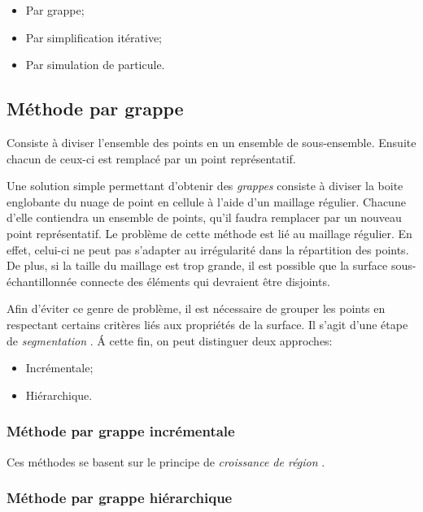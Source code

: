 \begin{itemize}
  \item Par grappe;
  \item Par simplification itérative;
  \item Par simulation de particule.
\end{itemize}

\subsection{Méthode par grappe}
\begin{definition}
  Consiste à diviser l'ensemble des points en un ensemble de sous-ensemble. Ensuite chacun de ceux-ci est remplacé par un point représentatif.
\end{definition}

Une solution simple permettant d'obtenir des \emph{grappes} consiste à diviser la boite englobante du nuage de point en cellule à l'aide d'un maillage régulier. Chacune d'elle contiendra un ensemble de points, qu'il faudra remplacer par un nouveau point représentatif.
Le problème de cette méthode est lié au maillage régulier. En effet, celui-ci ne peut pas s'adapter au irrégularité dans la répartition des points. De plus, si la taille du maillage est trop grande, il est possible que la surface sous-échantillonnée connecte des éléments qui devraient être disjoints.

Afin d'éviter ce genre de problème, il est nécessaire de grouper les points en respectant certains critères liés aux propriétés de la surface. Il s'agit d'une étape de \emph{segmentation} . \'{A} cette fin, on peut distinguer deux approches:

\begin{itemize}
  \item Incrémentale;
  \item Hiérarchique.
\end{itemize}

\subsubsection{Méthode par grappe incrémentale}

Ces méthodes se basent sur le principe de \emph{croissance de région} .

\subsubsection{Méthode par grappe hiérarchique}

